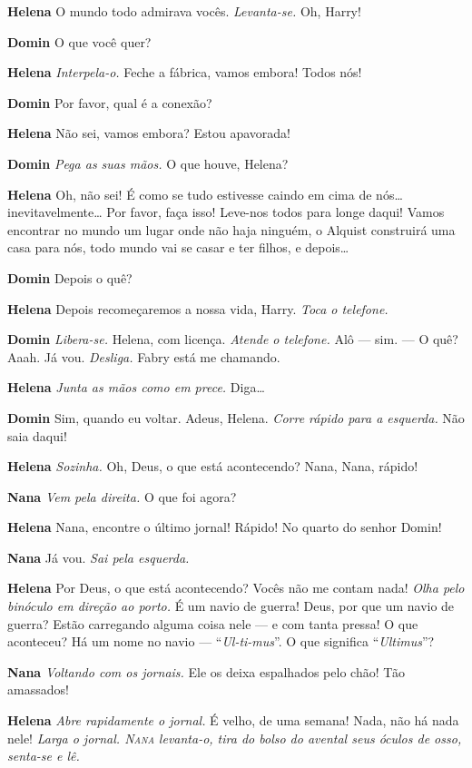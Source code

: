 \textbf{Helena} O mundo todo admirava vocês. \emph{Levanta-se.} Oh, Harry!

\textbf{Domin} O que você quer?

\textbf{Helena} \emph{Interpela-o.} Feche a fábrica, vamos embora! Todos nós!

\textbf{Domin} Por favor, qual é a conexão?

\textbf{Helena} Não sei, vamos embora? Estou apavorada!

\textbf{Domin} \emph{Pega as suas mãos.} O que houve, Helena?

\textbf{Helena} Oh, não sei! É como se tudo estivesse caindo em cima de nós\ldots{}
inevitavelmente\ldots{} Por favor, faça isso! Leve-nos todos para longe daqui! Vamos
encontrar no mundo um lugar onde não haja ninguém, o Alquist construirá uma casa
para nós, todo mundo vai se casar e ter filhos, e depois\ldots{}

\textbf{Domin} Depois o quê?

\textbf{Helena} Depois recomeçaremos a nossa vida, Harry.
\emph{Toca o telefone.}

\textbf{Domin} \emph{Libera-se.} Helena, com licença. \emph{Atende o telefone.} Alô
--- sim. --- O quê? Aaah. Já vou. \emph{Desliga.} Fabry está me chamando.

\textbf{Helena} \emph{Junta as mãos como em prece.} Diga\ldots{}

\textbf{Domin} Sim, quando eu voltar. Adeus, Helena. \emph{Corre rápido para a
esquerda.} Não saia daqui!

\textbf{Helena} \emph{Sozinha.} Oh, Deus, o que está acontecendo? Nana, Nana, rápido!

\textbf{Nana} \emph{Vem pela direita.} O que foi agora?

\textbf{Helena} Nana, encontre o último jornal! Rápido! No quarto do senhor Domin!

\textbf{Nana} Já vou. \emph{Sai pela esquerda.}

\textbf{Helena} Por Deus, o que está acontecendo? Vocês não me contam nada! \emph{Olha
pelo binóculo em direção ao porto.} É um navio de guerra! Deus, por que um navio de
guerra? Estão carregando alguma coisa nele --- e com tanta pressa! O que
aconteceu? Há um nome no navio --- ``\textit{Ul-ti-mus}''. O que significa
``\textit{Ultimus}''?

\textbf{Nana} \emph{Voltando com os jornais.} Ele os deixa espalhados pelo chão! Tão
amassados!

\textbf{Helena} \emph{Abre rapidamente o jornal.} É velho, de uma semana! Nada, não há
nada nele! \emph{Larga o jornal. \textsc{Nana} levanta-o, tira do bolso do avental seus óculos de osso, senta-se
e lê.}

